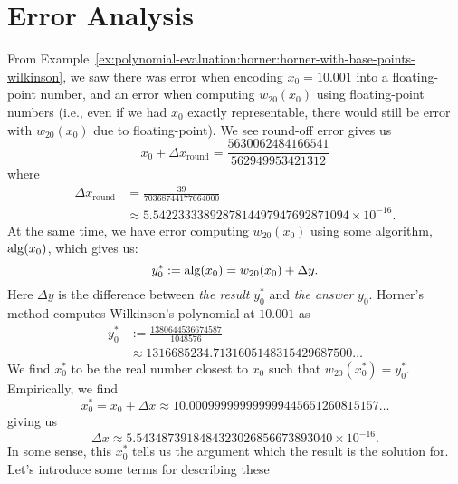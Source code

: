 \section{Error Analysis}

From
Example~\ref{ex:polynomial-evaluation:horner:horner-with-base-points-wilkinson},
we saw there was error when encoding $x_{0}=10.001$ into a floating-point
number, and an error when computing $w_{20}(x_{0})$ using floating-point
numbers (i.e., even if we had $x_{0}$ exactly representable, there would
still be error with $w_{20}(x_{0})$ due to floating-point). We see
round-off error gives us
\begin{equation}
  x_{0} + \Delta x_{\text{round}} = \frac{5630062484166541}{562949953421312}
\end{equation}
where
\begin{equation}
  \begin{split}
    \Delta x_{\text{round}} &= \frac{39}{70368744177664000}\\
    &\approx5.5422333389287814497947692871094 \times10^{-16}.
  \end{split}
\end{equation}
At the same time, we have error computing $w_{20}(x_{0})$ using some
algorithm, ${\rm alg}(x_{0})$, which gives us:
\begin{equation}
  y_{0}^{*} := {\rm alg}(x_{0}) = w_{20}(x_{0}) + \Delta y.
\end{equation}
Here $\Delta y$ is the difference between \emph{the result} $y_{0}^{*}$
and \emph{the answer} $y_{0}$. Horner's method computes Wilkinson's
polynomial at $10.001$ as
\begin{equation}
  \begin{split}
  y_{0}^{*} &:= \frac{1380644536674587}{1048576}\\
  &\approx 1316685234.7131605148315429687500\dots
  \end{split}
\end{equation}
We find $x_{0}^{*}$ to be the real number closest to $x_{0}$ such that
$w_{20}(x_{0}^{*})=y_{0}^{*}$. Empirically, we find
\begin{equation}
  x_{0}^{*} = x_{0} + \Delta x \approx 10.000999999999999445651260815157\dots
\end{equation}
giving us
\begin{equation}
  \Delta x \approx 5.5434873918484323026856673893040\times 10^{-16}.
\end{equation}
In some sense, this $x_{0}^{*}$ tells us the argument which the result
is the solution for. Let's introduce some terms for describing these
